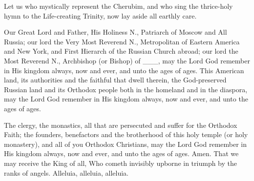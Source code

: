\begin{hymn}
    Let us who mystically represent the Cherubim, and who sing the thrice-holy hymn to the Life-creating Trinity, now lay aside all earthly care.
\end{hymn}
\begin{liturgicaltext}
    \deacon  Our Great Lord and Father, His Holiness N., Patriarch of Moscow and All Russia; our lord the Very Most Reverend N., Metropolitan of Eastern America and New York, and First Hierarch of the Russian Church abroad; our lord the Most Reverend  N., Archbishop (or Bishop) of \_\_\_, may the Lord God remember in His kingdom always, now and ever, and unto the ages of ages.
    \priest This American land, its authorities and the faithful that dwell therein, the God-preserved Russian land and its Orthodox people both in the homeland and in the diaspora, may the Lord God remember in His kingdom always, now and ever, and unto the ages of ages.
    \item[] The clergy, the monastics, all that are persecuted and suffer for the Orthodox Faith; the founders, benefactors and the brotherhood of this holy temple (or holy monastery), and all of you Orthodox Christians, may the Lord God remember in His kingdom always, now and ever, and unto the ages of ages.
    \choir Amen. That we may receive the King of all, Who cometh invisibly upborne in triumph by the ranks of angels. Alleluia, alleluia, alleluia.
\end{liturgicaltext}